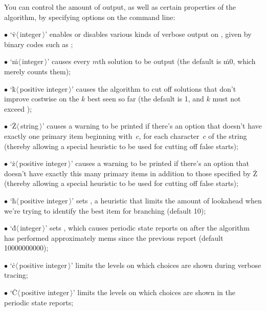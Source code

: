 You can control the amount of output, as well as certain properties
of the algorithm, by specifying options on the command line:
\smallskip\item{$\bullet$}
`\.v$\langle\,$integer$\,\rangle$' enables or disables various kinds of verbose
output on , given by binary codes such as ;
\item{$\bullet$}
`\.m$\langle\,$integer$\,\rangle$' causes every $m$th solution
to be output (the default is \.{m0}, which merely counts them);
\item{$\bullet$}
`\.k$\langle\,$positive integer$\,\rangle$' causes the algorithm to cut off
solutions that don't improve costwise on the $k$ best seen so far
(the default is 1, and $k$ must not exceed );
\item{$\bullet$}
`\.Z$\langle\,$string$\,\rangle$' causes a warning to be printed
if there's an option that doesn't have exactly one primary item
beginning with~$c$, for each character~$c$ of the string
(thereby allowing a special heuristic to be used for cutting off false starts);
\item{$\bullet$}
`\.z$\langle\,$positive integer$\,\rangle$' causes a warning to be printed
if there's an option that doesn't have exactly this many primary items
in addition to those specified by \.Z
(thereby allowing a special heuristic to be used for cutting off false starts);
\item{$\bullet$}
`\.h$\langle\,$positive integer$\,\rangle$' sets , a
heuristic that
limits the amount of lookahead when we're trying to identify the best item for
branching (default 10);
\item{$\bullet$}
`\.d$\langle\,$integer$\,\rangle$' sets , which causes periodic
state reports on  after the algorithm has performed
approximately
 mems since the previous report (default 10000000000);
\item{$\bullet$}
`\.c$\langle\,$positive integer$\,\rangle$' limits the levels on which
choices are shown during verbose tracing;
\item{$\bullet$}
`\.C$\langle\,$positive integer$\,\rangle$' limits the levels on which
choices are shown in the periodic state reports;
